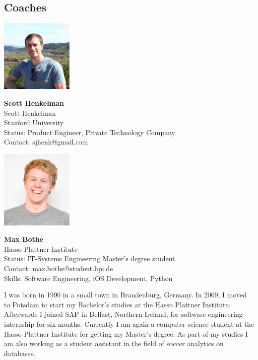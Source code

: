 \clearpage

\subsection{Coaches}

\vspace{0.5em}
\noindent \includegraphics[width=35mm]{Figures/People/Scott_Henkelman.jpg}
\hspace{0.5em}\parbox[b]{0.6\textwidth}{\textbf{Scott Henkelman}\\
Scott Henkelman\\Stanford University\\
Status: Product Engineer, Private Technology Company\\
Contact: sjhenk@gmail.com\\
}

\vspace{2em}
\noindent \includegraphics[width=35mm]{Figures/People/Max}
\hspace{0.5em}\parbox[b]{0.6\textwidth}{\textbf{Max Bothe}\\Hasso Plattner Institute\\
Status: IT-Systems Engineering Master's degree student\\
Contact: max.bothe@student.hpi.de\\
Skills: Software Engineering, iOS Development, Python\\
}

I was born in 1990 in a small town in Brandenburg, Germany. In 2009, I moved to Potsdam to start my Bachelor's studies at the Hasso Plattner Institute. Afterwards I joined SAP in Belfast, Northern Ireland, for software engineering internship for six months.
Currently I am again a computer science student at the Hasso Plattner Institute for getting my Master's degree. As part of my studies I am also working as a student assistant in the field of soccer analytics on databases.

